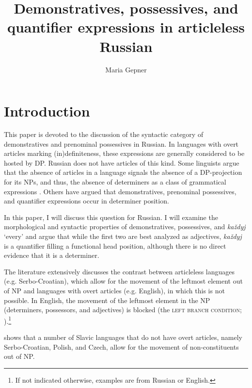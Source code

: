\documentclass[output=paper]{langscibook}
\author{Maria Gepner\affiliation{Bar Ilan University}}
\title[Demonstratives, possessives, and quantifier expressions]
      {Demonstratives, possessives, and quantifier expressions in articleless Russian}
\begin{document}
\maketitle

\section{Introduction}\label{introduction}
This paper is devoted to the discussion of the syntactic category of demonstratives and prenominal possessives in Russian. In languages with overt articles marking (in)definiteness, these expressions are generally considered to be hosted by DP. Russian does not have articles of this kind. Some linguists argue that the absence of articles in a language signals the absence of a DP-projection for its NPs, and thus, the absence of determiners as a class of grammatical expressions \citep{Boskovic2005a,Boskovic2007,Boskovic2009,Boskovic2010}. Others \citep{Engelhardt.Trugman1998,Rappaport2002,Franks.Pereltsvaig2004,Trugman2005,Trugman2007,Pereltsvaig2007} have argued that demonstratives, prenominal possessives, and quantifier expressions occur in determiner position.

In this paper, I will discuss this question for Russian. I will examine the morphological and syntactic properties of demonstratives, possessives, and \textit{každyj} `every' and argue that while the first two are best analyzed as adjectives, \textit{každyj} is a quantifier filling a functional head position, although there is no direct evidence that it is a determiner.

The literature extensively discusses the contrast between articleless languages (e.g. Serbo-Croatian), which allow for the movement of the leftmost element out of NP and languages with overt articles (e.g. English), in which this is not possible. In English, the movement of the leftmost element in the NP (determiners, possessors, and adjectives) is blocked (the \textsc{left branch condition}; \citealt{Ross1986}).\footnote{If not indicated otherwise, examples are from Russian or English.} 


\ea\label{whosefather}
\z\z

\noindent \citet{Boskovic2005a} shows that a number of Slavic languages that do not have overt articles, namely Serbo-Croatian, Polish, and Czech, allow for the movement of non-constituents out of NP.
\end{document}
